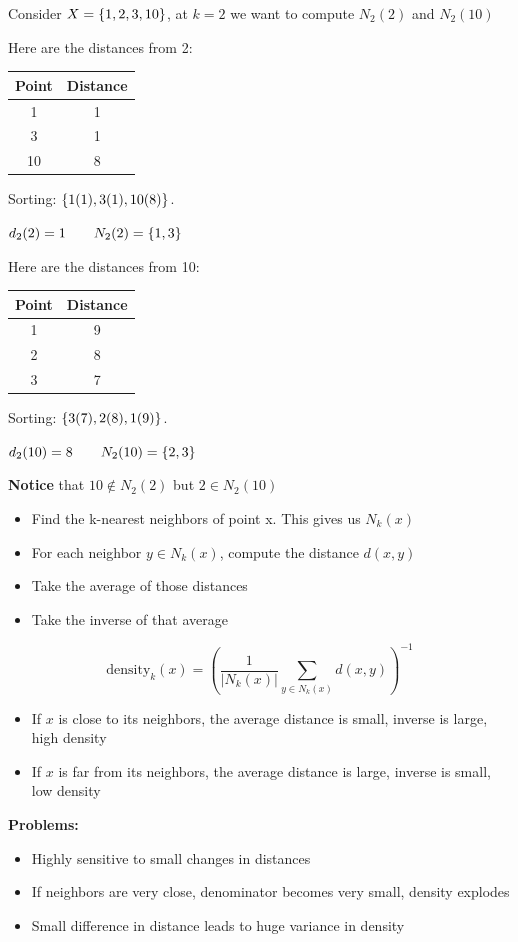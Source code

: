\documentclass{article}
\begin{document}
Consider $X = \{1,2,3,10\}$, at $k=2$ we want to compute $N_2(2)$ and $N_2(10)$

Here are the distances from 2:
\begin{tabular}{|c|c|} \hline
    Point & Distance \\ \hline
    1&1 \\ \hline
    3&1 \\ \hline
    10&8 \\ \hline
\end{tabular}
Sorting: $\{1 (1), 3 (1), 10 (8)\}$.

$d_2(2) = 1 \qquad N_2(2) = \{1,3\}$

Here are the distances from 10:
\begin{tabular}{|c|c|} \hline
    Point & Distance \\ \hline
    1&9 \\ \hline
    2&8 \\ \hline
    3&7 \\ \hline
\end{tabular}
Sorting: $\{3 (7), 2 (8), 1 (9)\}$.

$d_2(10) = 8 \qquad N_2(10) = \{2,3\}$

\textbf{Notice }that $10 \notin N_2(2)$ but $2 \in N_2(10)$

\begin{itemize}
    \item Find the k-nearest neighbors of point x. This gives us $N_k(x)$
    \item For each neighbor $y \in N_k(x)$, compute the distance $d(x,y)$
    \item Take the average of those distances
    \item Take the inverse of that average
\end{itemize}
\[
\text{density}_k(x) = \left( \frac{1}{|N_k(x)|} \sum_{y \in N_k(x)} d(x,y) \right)^{-1}
\]
\begin{itemize}
    \item If $x$ is close to its neighbors, the average distance is small, inverse is large, high density
    \item If $x$ is far from its neighbors, the average distance is large, inverse is small, low density
\end{itemize}

\textbf{Problems:}
\begin{itemize}
    \item Highly sensitive to small changes in distances
    \item If neighbors are very close, denominator becomes very small, density explodes
    \item Small difference in distance leads to huge variance in density
\end{itemize}
\end{document}
